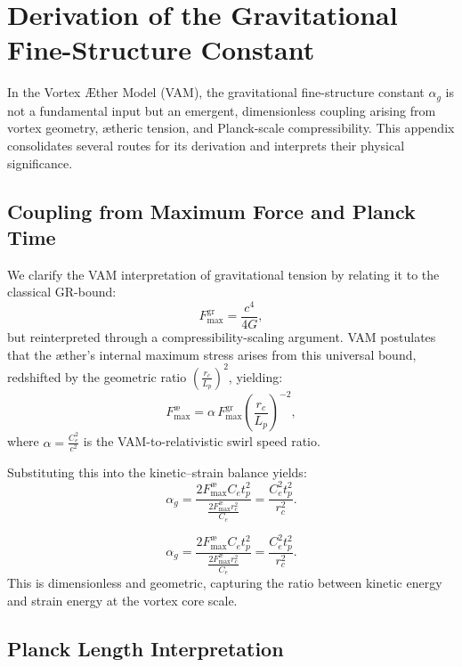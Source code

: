 \section{Derivation of the Gravitational Fine-Structure Constant}
\label{appendix:alpha_g}

In the Vortex Æther Model (VAM), the gravitational fine-structure constant $\alpha_g$ is not a fundamental input but an emergent, dimensionless coupling arising from vortex geometry, ætheric tension, and Planck-scale compressibility. This appendix consolidates several routes for its derivation and interprets their physical significance.

\subsection*{Coupling from Maximum Force and Planck Time}

We clarify the VAM interpretation of gravitational tension by relating it to the classical GR-bound:
\begin{equation}
    F^{\text{gr}}_{\text{max}} = \frac{c^4}{4G},
\end{equation}
but reinterpreted through a compressibility-scaling argument. VAM postulates that the æther's internal maximum stress arises from this universal bound, redshifted by the geometric ratio \( \left(\frac{r_c}{L_p}\right)^2 \), yielding:
\begin{equation}
    F^{\text{\ae}}_{\text{max}} = \alpha \, F^{\text{gr}}_{\text{max}} \left(\frac{r_c}{L_p}\right)^{-2}, \label{eq:FmaxVAM}
\end{equation}
where \( \alpha = \frac{C_e^2}{c^2} \) is the VAM-to-relativistic swirl speed ratio.

Substituting this into the kinetic–strain balance yields:
\begin{equation}
    \alpha_g = \frac{2 F^{\text{\ae}}_{\text{max}} C_e t_p^2}{\frac{2 F^{\text{\ae}}_{\text{max}} r_c^2}{C_e}} = \frac{C_e^2 t_p^2}{r_c^2}.
\end{equation}

\[
    \alpha_g = \frac{2 F^{\text{\ae}}_{\text{max}} C_e t_p^2}{\frac{2 F^{\text{\ae}}_{\text{max}} r_c^2}{C_e}} = \frac{C_e^2 t_p^2}{r_c^2}.
\]
This is dimensionless and geometric, capturing the ratio between kinetic energy and strain energy at the vortex core scale.

\subsection*{Planck Length Interpretation}

